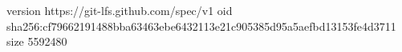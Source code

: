version https://git-lfs.github.com/spec/v1
oid sha256:cf79662191488bba63463ebe6432113e21c905385d95a5aefbd13153fe4d3711
size 5592480
